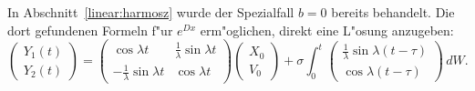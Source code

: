 In Abschnitt~\ref{linear:harmosz} wurde der Spezialfall $b=0$ bereits
behandelt.
Die dort gefundenen Formeln f"ur $e^{Dx}$ erm"oglichen, direkt eine
L"osung anzugeben:
\begin{equation}
\begin{pmatrix}
Y_1(t)\\Y_2(t)
\end{pmatrix}
=
\begin{pmatrix}
                \cos\lambda t&\frac1{\lambda}\sin\lambda t\\
-\frac1{\lambda}\sin\lambda t&               \cos\lambda t
\end{pmatrix}
\begin{pmatrix}X_0\\V_0\end{pmatrix}
+
\sigma\int_0^t
\begin{pmatrix}
\frac1{\lambda}\sin\lambda(t-\tau)\\
               \cos\lambda(t-\tau)
\end{pmatrix}\,dW.
\label{stochastisch:harmosz-y2}
\end{equation}
